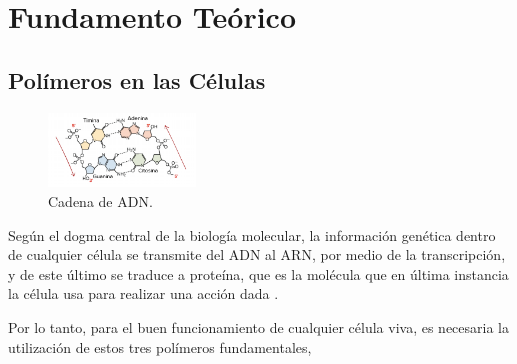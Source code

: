 \documentclass[a4paper,11pt,titlepage]{article}
\theoremstyle{definition}
\begin{document}

\section{Fundamento Teórico}\label{sec:thry}

\subsection{Polímeros en las Células}\label{subsec:polymers}

\begin{figure}
    \begin{center}
      \includegraphics[width=0.35\textwidth]{images/adn.png}
    \end{center}
    \small{\caption{Cadena de ADN.}\label{fig:adnchain}}\normalsize
\end{figure}

Según el dogma central de la biología molecular, la información genética dentro de cualquier célula se transmite del ADN al ARN, por medio de la transcripción, y de este último se traduce a proteína, que es la molécula que en última instancia la célula usa para realizar una acción dada \cite{alberts}.

Por lo tanto, para el buen funcionamiento de cualquier célula viva, es necesaria la utilización de estos tres polímeros fundamentales,
\end{document}
